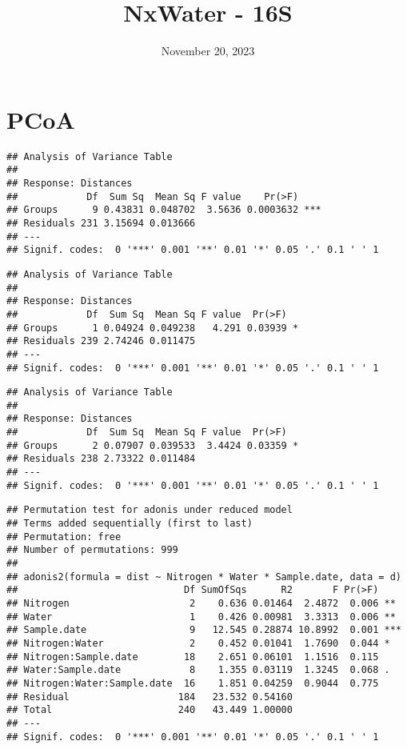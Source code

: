 \documentclass[
]{article}
\title{NxWater - 16S}
\author{}
\date{\vspace{-2.5em}November 20, 2023}
\begin{document}
\maketitle

{
\setcounter{tocdepth}{2}
\tableofcontents
}
\hypertarget{pcoa}{%
\section{PCoA}\label{pcoa}}

\begin{verbatim}
## Analysis of Variance Table
## 
## Response: Distances
##            Df  Sum Sq  Mean Sq F value    Pr(>F)    
## Groups      9 0.43831 0.048702  3.5636 0.0003632 ***
## Residuals 231 3.15694 0.013666                      
## ---
## Signif. codes:  0 '***' 0.001 '**' 0.01 '*' 0.05 '.' 0.1 ' ' 1
\end{verbatim}

\begin{verbatim}
## Analysis of Variance Table
## 
## Response: Distances
##            Df  Sum Sq  Mean Sq F value  Pr(>F)  
## Groups      1 0.04924 0.049238   4.291 0.03939 *
## Residuals 239 2.74246 0.011475                  
## ---
## Signif. codes:  0 '***' 0.001 '**' 0.01 '*' 0.05 '.' 0.1 ' ' 1
\end{verbatim}

\begin{verbatim}
## Analysis of Variance Table
## 
## Response: Distances
##            Df  Sum Sq  Mean Sq F value  Pr(>F)  
## Groups      2 0.07907 0.039533  3.4424 0.03359 *
## Residuals 238 2.73322 0.011484                  
## ---
## Signif. codes:  0 '***' 0.001 '**' 0.01 '*' 0.05 '.' 0.1 ' ' 1
\end{verbatim}

\begin{verbatim}
## Permutation test for adonis under reduced model
## Terms added sequentially (first to last)
## Permutation: free
## Number of permutations: 999
## 
## adonis2(formula = dist ~ Nitrogen * Water * Sample.date, data = d)
##                             Df SumOfSqs      R2       F Pr(>F)    
## Nitrogen                     2    0.636 0.01464  2.4872  0.006 ** 
## Water                        1    0.426 0.00981  3.3313  0.006 ** 
## Sample.date                  9   12.545 0.28874 10.8992  0.001 ***
## Nitrogen:Water               2    0.452 0.01041  1.7690  0.044 *  
## Nitrogen:Sample.date        18    2.651 0.06101  1.1516  0.115    
## Water:Sample.date            8    1.355 0.03119  1.3245  0.068 .  
## Nitrogen:Water:Sample.date  16    1.851 0.04259  0.9044  0.775    
## Residual                   184   23.532 0.54160                   
## Total                      240   43.449 1.00000                   
## ---
## Signif. codes:  0 '***' 0.001 '**' 0.01 '*' 0.05 '.' 0.1 ' ' 1
\end{verbatim}
\end{document}
